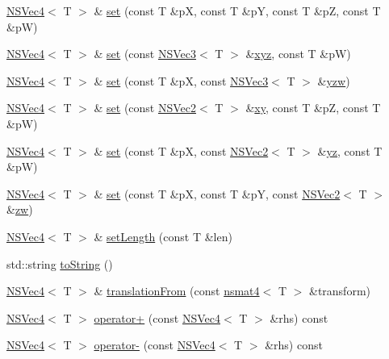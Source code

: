 \begin{DoxyCompactItemize}
\hyperlink{structNSVec4}{N\-S\-Vec4}$<$ T $>$ \& \hyperlink{structNSVec4_a7dc9abfba672c1a297a4b7d187777fc9}{set} (const T \&p\-X, const T \&p\-Y, const T \&p\-Z, const T \&p\-W)
\item 
\hyperlink{structNSVec4}{N\-S\-Vec4}$<$ T $>$ \& \hyperlink{structNSVec4_acc130a42fc8639035d30145aab1249ab}{set} (const \hyperlink{structNSVec3}{N\-S\-Vec3}$<$ T $>$ \&\hyperlink{structNSVec4_a35b541a03b7f0f95a7f746a5bd6b7195}{xyz}, const T \&p\-W)
\item 
\hyperlink{structNSVec4}{N\-S\-Vec4}$<$ T $>$ \& \hyperlink{structNSVec4_a004daf763a39731f5e59ad872625f20a}{set} (const T \&p\-X, const \hyperlink{structNSVec3}{N\-S\-Vec3}$<$ T $>$ \&\hyperlink{structNSVec4_a06d459bf5ab6a486f902a39676f5c087}{yzw})
\item 
\hyperlink{structNSVec4}{N\-S\-Vec4}$<$ T $>$ \& \hyperlink{structNSVec4_a26ba390be31c40bf20d9d377b8df1a02}{set} (const \hyperlink{structNSVec2}{N\-S\-Vec2}$<$ T $>$ \&\hyperlink{structNSVec4_ad46b30c4093a912f1f52811fa4d0397e}{xy}, const T \&p\-Z, const T \&p\-W)
\item 
\hyperlink{structNSVec4}{N\-S\-Vec4}$<$ T $>$ \& \hyperlink{structNSVec4_a49252bdee015c6bad4a86af2e5b9ea45}{set} (const T \&p\-X, const \hyperlink{structNSVec2}{N\-S\-Vec2}$<$ T $>$ \&\hyperlink{structNSVec4_a6380a85ef86f586af599f6154777042e}{yz}, const T \&p\-W)
\item 
\hyperlink{structNSVec4}{N\-S\-Vec4}$<$ T $>$ \& \hyperlink{structNSVec4_a4a38f09686e455df86b2fbe01853a69b}{set} (const T \&p\-X, const T \&p\-Y, const \hyperlink{structNSVec2}{N\-S\-Vec2}$<$ T $>$ \&\hyperlink{structNSVec4_af5912d46333b72a29f6ff8e7429dd339}{zw})
\item 
\hyperlink{structNSVec4}{N\-S\-Vec4}$<$ T $>$ \& \hyperlink{structNSVec4_ad65229428700333956098810f3dd2243}{set\-Length} (const T \&len)
\item 
std\-::string \hyperlink{structNSVec4_abd85191e95620b7e1053c3810e820993}{to\-String} ()
\item 
\hyperlink{structNSVec4}{N\-S\-Vec4}$<$ T $>$ \& \hyperlink{structNSVec4_a184d31d646db8756e9aee9efdeb0d898}{translation\-From} (const \hyperlink{structnsmat4}{nsmat4}$<$ T $>$ \&transform)
\item 
\hyperlink{structNSVec4}{N\-S\-Vec4}$<$ T $>$ \hyperlink{structNSVec4_a3c98c394ca2b796c33d12a1fceb969d6}{operator+} (const \hyperlink{structNSVec4}{N\-S\-Vec4}$<$ T $>$ \&rhs) const 
\item 
\hyperlink{structNSVec4}{N\-S\-Vec4}$<$ T $>$ \hyperlink{structNSVec4_af20ceb4ed583d3adac120a77f3779975}{operator-\/} (const \hyperlink{structNSVec4}{N\-S\-Vec4}$<$ T $>$ \&rhs) const 

\end{DoxyCompactItemize}
